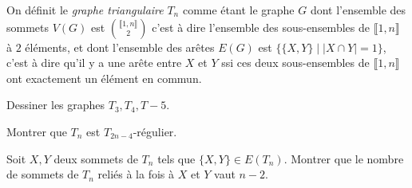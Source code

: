\documentclass[french]{report}
\begin{document}
\begin{exo}
    On définit le \textit{graphe triangulaire} \(T_n\) comme étant le graphe \(G\)
    dont l'ensemble des sommets \(V(G)\) est \(\binom{\llbracket1,n\rrbracket}{2}\)
    c'est à dire l'ensemble des sous-ensembles de \(\llbracket1,n\rrbracket\) à \(2\)
    éléments, et dont l'ensemble des arêtes \(E(G)\) est \(\{\{X,Y\}\mid|X\cap Y|=1\}\),
    c'est à dire qu'il y a une arête entre \(X\) et \(Y\) ssi ces deux sous-ensembles
    de \(\llbracket1,n\rrbracket\) ont exactement un élément en commun.
    \begin{q}{1}
        Dessiner les graphes \(T_3, T_4,T-5\).
    \end{q}
    \begin{q}{2}
        Montrer que \(T_n\) est \(T_{2n-4}\)-régulier.
    \end{q}
    \begin{q}{3}
        Soit \(X,Y\) deux sommets de \(T_n\) tels que \(\{X,Y\}\in E(T_n)\). Montrer
        que le nombre de sommets de \(T_n\) reliés à la fois à \(X\) et \(Y\) vaut
        \(n-2\).
    \end{q}
\end{exo}
\end{document}

